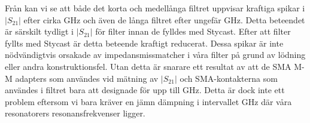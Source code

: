 \documentclass[main.tex]{subfiles}
\begin{document}
Från  kan vi se att både det korta och medellånga filtret uppvisar kraftiga spikar i $|S_{21}|$ efter cirka \unit[25]{GHz} och även de långa filtret efter ungefär \unit[40]{GHz}. Detta beteendet är särskilt tydligt i $|S_{21}|$ för filter innan de fylldes med Stycast. Efter att filter fyllts med Stycast är detta beteende kraftigt reducerat. Dessa spikar är inte nödvändigtvis orsakade av impedansmissmatcher i våra filter på grund av lödning eller andra konstruktionsfel. Utan detta är snarare ett resultat av att de SMA M-M adapters som användes vid mätning av $|S_{21}|$ och SMA-kontakterna som användes i filtret bara att designade för upp till \unit[18]{GHz}. Detta är dock inte ett problem eftersom vi bara kräver en jämn dämpning i intervallet \unit[4-8]{GHz} där våra resonatorers resonansfrekvenser ligger.
\end{document}
